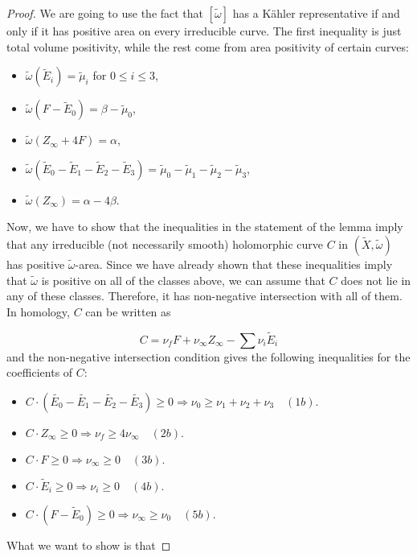 \begin{proof}
We are going to use the fact that $[\tilde{\omega}]$ has a K\"ahler representative if and only if it has positive area on every irreducible curve. The first inequality is just total volume positivity, while the rest come from area positivity of certain curves: 
\begin{itemize}
    
    \item $\tilde{\omega}(\widetilde{E}_i)=\tilde{\mu}_i$ for $0\leq i\leq 3$,
    \item $\tilde{\omega}(F-\widetilde{E}_0)=\beta-\tilde{\mu}_0$,
    \item $\tilde{\omega}(Z_\infty+4F)=\alpha$,
    \item $\tilde{\omega}(\widetilde{E}_0-\widetilde{E}_1-\widetilde{E}_2-\widetilde{E}_3)=\tilde{\mu}_0-\tilde{\mu}_1-\tilde{\mu}_2-\tilde{\mu}_3$,
    \item $\tilde{\omega}(Z_\infty)=\alpha-4\beta$.
\end{itemize}

Now, we have to show that the inequalities in the statement of the lemma imply that any irreducible (not necessarily smooth) holomorphic curve $C$ in $(\widetilde{X},\tilde{\omega})$ has positive $\tilde{\omega}$-area. Since we have already shown that these inequalities imply that $\tilde{\omega}$ is positive on all of the classes above, we can assume that $C$ does not lie in any of these classes. Therefore, it has non-negative intersection with all of them. In homology, $C$ can be written as

\[C=\nu_fF+\nu_\infty Z_\infty-\sum\nu_i\widetilde{E}_i\]
and the non-negative intersection condition gives the following inequalities for the coefficients of $C$:

\begin{itemize}
    \item $C\cdot(\widetilde{E_0}-\widetilde{E_1}-\widetilde{E_2}-\widetilde{E_3})\geq 0\Rightarrow \nu_0\geq \nu_1+\nu_2+\nu_3 \quad (1b).$
    \item $C\cdot Z_\infty\geq 0\Rightarrow \nu_f\geq 4\nu_\infty\quad (2b).$
    \item $C\cdot F\geq 0\Rightarrow \nu_\infty\geq 0\quad (3b).$
    \item $C\cdot \widetilde{E}_i\geq 0\Rightarrow \nu_i\geq 0 \quad(4b).$
    \item $C\cdot (F-\widetilde{E}_0)\geq 0\Rightarrow \nu_\infty\geq \nu_0\quad (5b).$
\end{itemize}
What we want to show is that 


\end{proof}
